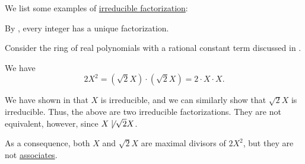 \begin{example}\label{ex:def:irreducible_factorization}
  We list some examples of \hyperref[def:irreducible_factorization]{irreducible factorization}:
  \begin{thmenum}
     By , every integer has a unique factorization.

     Consider the ring of real polynomials with a rational constant term discussed in .

    We have
    \begin{equation*}
      2X^2 = (\sqrt 2 X) \cdot (\sqrt 2 X) = 2 \cdot X \cdot X.
    \end{equation*}

    We have shown in  that \( X \) is irreducible, and we can similarly show that \( \sqrt 2 X \) is irreducible. Thus, the above are two irreducible factorizations. They are not equivalent, however, since \( X \not\mid \sqrt 2 X \).

    As a consequence, both \( X \) and \( \sqrt 2 X \) are maximal divisors of \( 2X^2 \), but they are not \hyperref[def:domain_divisibility/associates]{associates}.
  \end{thmenum}
\end{example}

